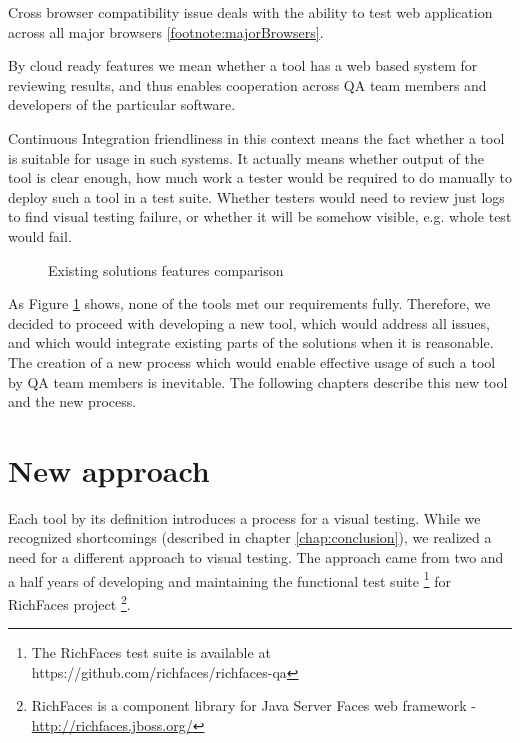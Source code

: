 \documentclass[11pt,oneside,final]{fithesis2}
\begin{document}
  Cross browser compatibility issue deals with the ability to test web application across all major browsers \ref{footnote:majorBrowsers}.
  
  By cloud ready features we mean whether a tool has a web based system for reviewing results, and thus enables cooperation across QA team members and developers of the particular software.
  
  Continuous Integration friendliness in this context means the fact whether a tool is suitable for usage in such systems. It actually means whether output of the tool is clear enough,
  how much work a tester would be required to do manually to deploy such a tool in a test suite. Whether testers would need to review just logs to find visual testing failure, or
  whether it will be somehow visible, e.g. whole test would fail.
  
  \begin{figure}[!htb]
    \begin{center}
    \leavevmode
    \centerline{}
    \end{center}
    \caption{Existing solutions features comparison}
    \label{fig:existingSolutionComparison} 
  \end{figure}
  
  As Figure \ref{fig:existingSolutionComparison} shows, none of the tools met our requirements fully. Therefore, we decided to proceed with developing a new tool, which would address
  all issues, and which would integrate existing parts of the solutions when it is reasonable. The creation of a new process which would enable effective usage of such a
  tool by QA team members is inevitable. The following chapters describe this new tool and the new process.
  
\chapter{New approach}
  Each tool by its definition introduces a process for a visual testing. While we recognized shortcomings (described in chapter \ref{chap:conclusion}), we realized a need for a different 
  approach to visual testing. The approach came from two and a half years of developing and maintaining the functional test suite \footnote{The RichFaces test suite is available at 
  https://github.com/richfaces/richfaces-qa} for RichFaces project \footnote{RichFaces is a component library for Java Server Faces web framework - \url{http://richfaces.jboss.org/}}.
  
\end{document}
